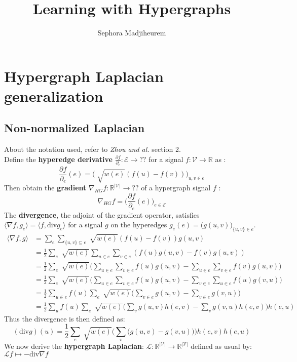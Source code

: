 \documentclass[12pt]{article}\pagestyle{myheadings}
\title{Learning with Hypergraphs}
\author{Sephora Madjiheurem}
\theoremstyle{plain}
\newcommand{\R}{\mathbb{R}}
\newcommand{\V}{\mathcal{V}}
\newcommand{\E}{\mathcal{E}}
\newcommand{\lapl}{\mathcal{L}}
\newcommand{\Div}{\text{div}}
\begin{document}
\maketitle

\section{Hypergraph Laplacian generalization}
\subsection{Non-normalized Laplacian}
About the notation used, refer to \textit{Zhou and al.} section 2.\\ 
Define the \textbf{hyperedge derivative} $\frac{\partial f}{\partial_e} : \E \rightarrow ?? $ for a signal $f: \V \rightarrow \R$ as :
$$\frac{\partial f}{\partial_e} (e) = \bigg( \sqrt[]{w(e)}(f(u)-f(v)) \bigg)_{u,v \in e} $$
Then obtain the \textbf{gradient} $\nabla_{HG} f: \R ^{|\V|} \rightarrow ??$  of a hypergraph signal $f$ :
$$ \nabla_{HG} f = \bigg( \frac{\partial f}{\partial_e}(e) \bigg)_{e \in \E}$$
The \textbf{divergence}, the adjoint of the gradient operator, satisfies $\langle \nabla f, g_e \rangle = \langle f, \Div g_e\rangle$ for a signal $g$ on the hyperedges $g_e(e) = \big( g(u,v) \big )_{\{ u,v\} \in e}$. 
\begin{equation*}
\begin{split}
\langle \nabla f, g \rangle  & = \sum_e \sum_{ \{u,v\} \subseteq e} \sqrt[]{w(e)}(f(u)-f(v)) g(u,v)\\
& = \frac{1}{2}\sum_e \sqrt[]{w(e)}  \sum_{u \in e} \sum_{v \in e} (f(u)g(u,v)-f(v)g(u,v))  \\
& =  \frac{1}{2}\sum_e \sqrt[]{w(e)} \big( \sum_{u \in e} \sum_{v \in e} f(u)g(u,v) - \sum_{u \in e} \sum_{v \in e} f(v)g(u,v) \big) \\
& = \frac{1}{2}\sum_e \sqrt[]{w(e)} \big( \sum_{u \in e} \sum_{v \in e} f(u)g(u,v) - \sum_{v \in e} \sum_{u \in e} f(u)g(v,u) \big) \\
& = \frac{1}{2}\sum_{u \in e} f(u) \sum_e \sqrt[]{w(e)} \big(  \sum_{v \in e} g(u,v) - \sum_{v \in e}  g(v,u) \big) \\
& = \frac{1}{2}\sum_{u} f(u) \sum_e \sqrt[]{w(e)} \big(  \sum_{v } g(u,v)h(e,v) - \sum_{v}  g(v,u)h(e,v) \big)h(e,u) 
\end{split}
\end{equation*}
Thus the divergence is then defined as:
$$(\Div g)(u) = \frac{1}{2} \sum_e \sqrt[]{w(e)} \big(  \sum_{v } \big( g(u,v)-  g(v,u) \big)\big)h(e,v) h(e,u)$$
We now derive the \textbf{hypergraph Laplacian}: $\lapl: \R^{|\V|} \rightarrow \R^{|\V|}$ defined as usual by: $ \lapl f \mapsto -\Div \nabla f$
\end{document}
